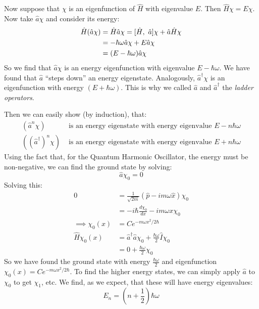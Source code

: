 \documentclass[../Main.tex]{subfiles}
\begin{document}
Now suppose that $\chi$ is an eigenfunction of $\hat{H}$ with eigenvalue $E$. Then $\hat{H} \chi = E\chi$. Now take $\hat{a} \chi$ and consider its energy:
\begin{align*}
    \hat{H}(\hat{a}\chi) &= \hat{H} \hat{a} \chi = [\hat{H},~\hat{a}] \chi + \hat{a} \hat{H} \chi \\
    &= -\hbar \omega \hat{a} \chi + E\hat{a} \chi \\
    &= (E - \hbar \omega) \hat{a} \chi
\end{align*}
So we find that $\hat{a} \chi$ is an energy eigenfunction with eigenvalue $E - \hbar \omega$. We have found that $\hat{a}$ ``steps down'' an energy eigenstate. Analogously, $\hat{a}^\dagger \chi$ is an eigenfunction with energy $(E + \hbar \omega)$. This is why we called $\hat{a}$ and $\hat{a}^\dagger$ the \textit{ladder operators}.

Then we can easily show (by induction), that:
\begin{align*}
    (\hat{a}^n \chi)&\text{ is an energy eigenstate with energy eigenvalue }E - n \hbar \omega \\
    ((\hat{a}^\dagger)^n \chi)&\text{ is an energy eigenstate with energy eigenvalue }E + n \hbar \omega
\end{align*}
Using the fact that, for the Quantum Harmonic Oscillator, the energy must be non-negative, we can find the ground state by solving:
\begin{equation*}
    \hat{a} \chi_0 = 0
\end{equation*}
Solving this:
\begin{align*}
    0&= \frac{1}{\sqrt{2m}}(\hat{p} - i m \omega \hat{x}) \chi_0 \\
    &= -i \hbar \frac{d\chi_0}{dx} - i m \omega x \chi_0 \\
    \implies \chi_0(x) &= Ce^{-m \omega x^2 / 2\hbar} \\
    \hat{H} \chi_0(x) &= \hat{a}^\dagger \hat{a} \chi_0 + \frac{\hbar \omega}{2} \hat{I} \chi_0 \\
    &= 0 + \frac{\hbar \omega}{2} \chi_0
\end{align*}
So we have found the ground state with energy $\frac{\hbar \omega}{2}$ and eigenfunction $\chi_0(x) = Ce^{-m \omega x^2 / 2\hbar}$. To find the higher energy states, we can simply apply $\hat{a}$ to $\chi_0$ to get $\chi_1$, etc. We find, as we expect, that these will have energy eigenvalues:
\begin{equation*}
    E_n = \left(n + \frac12\right)\hbar \omega
\end{equation*}
\end{document}
